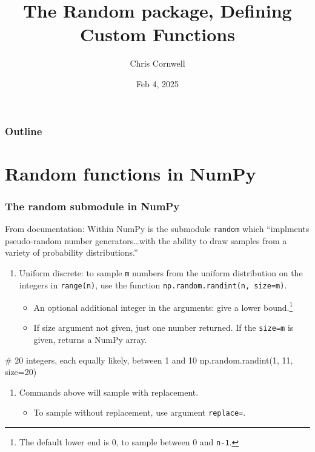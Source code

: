 \documentclass{beamer}
\author{Chris Cornwell}
\date{Feb 4, 2025}
\title{The Random package, Defining Custom Functions}
\newenvironment{codeblock}
    {\hfill\begin{beamerboxesrounded}[lower=codecol, width=0.8\textwidth]
    \medskip

    }
    { 
    \end{beamerboxesrounded}\hfill
    }
\theoremstyle{example}
\newcommand{\ttt}[1]{{\small\texttt{#1}}}
\begin{document}
\begin{frame}
\titlepage
\end{frame}

\begin{frame}
\frametitle{Outline}
\tableofcontents
\end{frame}

\section{Random functions in NumPy}

\begin{frame}[fragile]
\frametitle{The {\ttm random} submodule in NumPy}
From documentation: Within NumPy is the submodule \ttt{random} which ``implments pseudo-random number generators\ldots with the ability to draw samples from a variety of probability distributions.''
\begin{enumerate}
    \item Uniform discrete: to sample \ttt{m} numbers from the uniform distribution on the integers in \ttt{range(n)}, use the function \ttt{np.random.randint(n, size=m)}. 
    \begin{itemize}
        \item An optional additional integer in the arguments: give a lower bound.\footnote{The default lower end is 0, to sample between 0 and \ttt{n-1}.}
        \item If size argument not given, just one number returned. If the \ttt{size=m} is given, returns a NumPy array.
    \end{itemize}
\end{enumerate}

\begin{codeblock}

\begin{python}
    # 20 integers, each equally likely, between 1 and 10
    np.random.randint(1, 11, size=20)
\end{python}

\end{codeblock}

\begin{enumerate}
    \item[] Commands above will sample with replacement.
    \begin{itemize}
        \item To sample without replacement, use argument \ttt{replace=}{\color{numeric}\ttt{False}}.
    \end{itemize}
\end{enumerate}

\end{frame}
\end{document}
